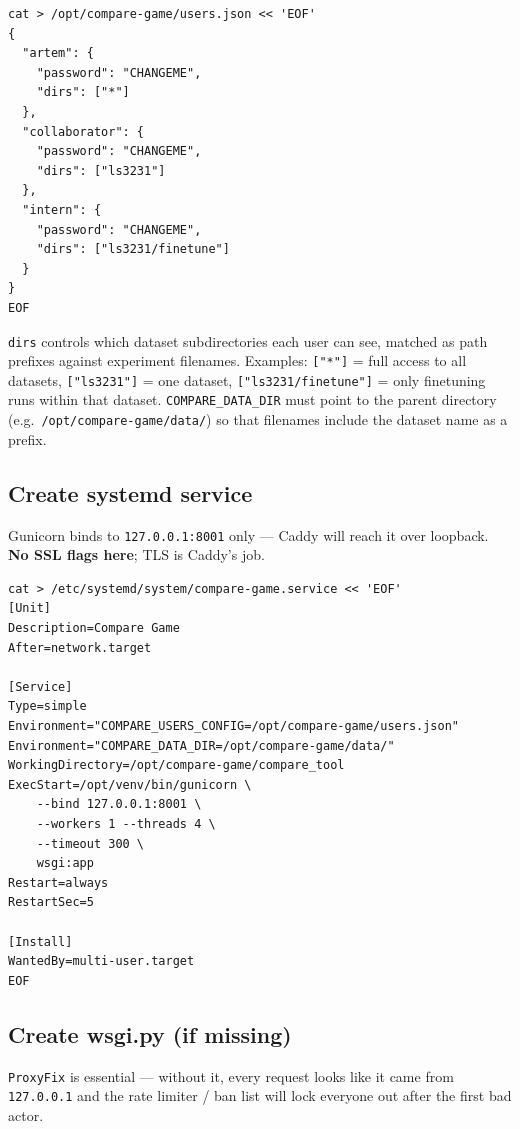 \documentclass[11pt]{article}
\begin{document}
\begin{lstlisting}
cat > /opt/compare-game/users.json << 'EOF'
{
  "artem": {
    "password": "CHANGEME",
    "dirs": ["*"]
  },
  "collaborator": {
    "password": "CHANGEME",
    "dirs": ["ls3231"]
  },
  "intern": {
    "password": "CHANGEME",
    "dirs": ["ls3231/finetune"]
  }
}
EOF
\end{lstlisting}

\texttt{dirs} controls which dataset subdirectories each user can see, matched as path prefixes against experiment filenames. Examples: \texttt{["*"]} = full access to all datasets, \texttt{["ls3231"]} = one dataset, \texttt{["ls3231/finetune"]} = only finetuning runs within that dataset. \texttt{COMPARE\_DATA\_DIR} must point to the parent directory (e.g.\ \texttt{/opt/compare-game/data/}) so that filenames include the dataset name as a prefix.

\subsection{Create systemd service}

Gunicorn binds to \texttt{127.0.0.1:8001} only — Caddy will reach it over loopback. \textbf{No SSL flags here}; TLS is Caddy's job.

\begin{lstlisting}
cat > /etc/systemd/system/compare-game.service << 'EOF'
[Unit]
Description=Compare Game
After=network.target

[Service]
Type=simple
Environment="COMPARE_USERS_CONFIG=/opt/compare-game/users.json"
Environment="COMPARE_DATA_DIR=/opt/compare-game/data/"
WorkingDirectory=/opt/compare-game/compare_tool
ExecStart=/opt/venv/bin/gunicorn \
    --bind 127.0.0.1:8001 \
    --workers 1 --threads 4 \
    --timeout 300 \
    wsgi:app
Restart=always
RestartSec=5

[Install]
WantedBy=multi-user.target
EOF
\end{lstlisting}

\subsection{Create wsgi.py (if missing)}

\texttt{ProxyFix} is essential — without it, every request looks like it came from \texttt{127.0.0.1} and the rate limiter / ban list will lock everyone out after the first bad actor.
\end{document}
